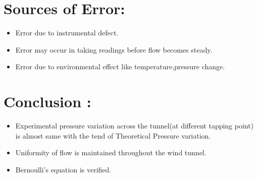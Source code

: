 \documentclass[12pt,a4paper]{article}
\begin{document}
\section{Sources of Error:}
\begin{itemize}
    \item Error due to instrumental defect.
    \item Error may occur in taking readings before flow becomes steady.
    \item Error due to environmental effect like temperature,pressure change.
\end{itemize}



\section{Conclusion :}
\begin{itemize}
    \item Experimental pressure variation across the tunnel(at different tapping point) is almost same with the tend of Theoretical Pressure variation. 
    \item Uniformity of flow is maintained throughout the wind tunnel.
    \item Bernoulli's equation is verified. 
\end{itemize}
\end{document}
